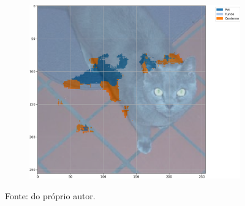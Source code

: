 \begin{figure}[H]
\begin{subfigure}[t]{0.32\textwidth}
         \label{results:fig:semantic:11.2}
     \end{subfigure}%
     ~ 
    \begin{subfigure}[t]{0.32\textwidth}
         \centering
         \includegraphics[width=1\linewidth]{recursos/imagens/results/max_acc_unetlike500_image_2_overlayed_segmentation.png}
         \label{results:fig:semantic:11.3}
     \end{subfigure}%

    Fonte: do próprio autor.
\end{figure}


